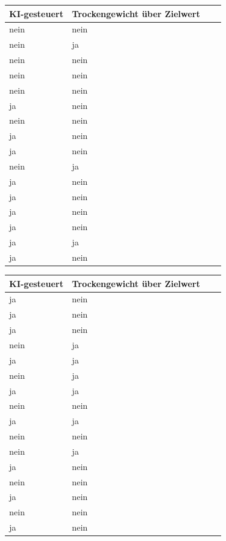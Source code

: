 \documentclass[a4paper, 9pt]{scrartcl}\usepackage[]{graphicx}\usepackage[]{xcolor}
\begin{document}
\begin{center}
\begin{minipage}[t]{0.45\textwidth}
\begin{center}

\begin{tabular}{p{2.5cm}p{2.5cm}p{2.5cm}p{2.5cm}}
\toprule
KI-gesteuert & Trockengewicht über Zielwert\\
\midrule
nein & nein\\
nein & ja\\
nein & nein\\
nein & nein\\
nein & nein\\
\addlinespace
ja & nein\\
nein & nein\\
ja & nein\\
ja & nein\\
nein & ja\\
\addlinespace
ja & nein\\
ja & nein\\
ja & nein\\
ja & nein\\
ja & ja\\
\addlinespace
ja & nein\\
\bottomrule
\end{tabular}


\end{center}
\end{minipage}
\begin{minipage}[t]{0.45\textwidth}
\begin{center}

\begin{tabular}{p{2.5cm}p{2.5cm}p{2.5cm}p{2.5cm}}
\toprule
KI-gesteuert & Trockengewicht über Zielwert\\
\midrule
ja & nein\\
ja & nein\\
ja & nein\\
nein & ja\\
ja & ja\\
\addlinespace
nein & ja\\
ja & ja\\
nein & nein\\
ja & ja\\
nein & nein\\
\addlinespace
nein & ja\\
ja & nein\\
nein & nein\\
ja & nein\\
nein & nein\\
\addlinespace
ja & nein\\
\bottomrule
\end{tabular}


\end{center}
\end{minipage}
\end{center}
\end{document}
